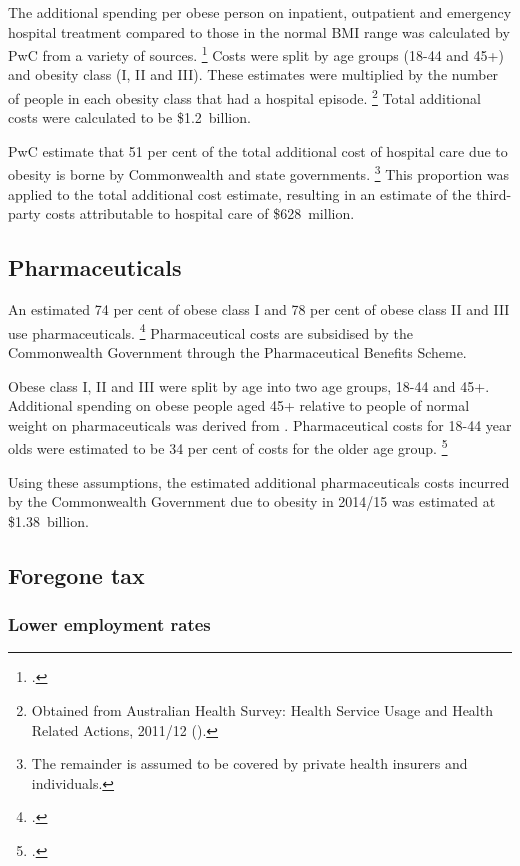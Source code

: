 \documentclass[embargoed]{grattan}
\begin{document}
The additional spending per obese person on inpatient, outpatient and emergency hospital treatment compared to those in the normal BMI range was calculated by PwC from a variety of sources.%
\footcite[][48]{PwC2015Weighingcostobesity} Costs were split by age groups (18-44 and 45+) and obesity class (I, II and III).
These estimates were multiplied by the number of people in each obesity class that had a hospital episode.%
\footnote{Obtained from Australian Health Survey: Health Service Usage and Health Related Actions, 2011/12 (\textcite{ABS20134364055002AustralianHealth}).} Total additional costs were calculated to be \$1.2~billion.

PwC estimate that 51 per cent of the total additional cost of hospital care due to obesity is borne by Commonwealth and state governments.%
\footnote{The remainder is assumed to be covered by private health insurers and individuals.} This proportion was applied to the total additional cost estimate, resulting in an estimate of the third-party costs attributable to hospital care of \$628~million.

\subsection{Pharmaceuticals }\label{pharmaceuticals}

An estimated 74 per cent of obese class I and 78 per cent of obese class II and III use pharmaceuticals.%
\footcite{Buchmueller2015Obesityhealthexpenditures} Pharmaceutical costs are subsidised by the Commonwealth Government through the Pharmaceutical Benefits Scheme.

Obese class I, II and III were split by age into two age groups, 18-44 and 45+.
Additional spending on obese people aged 45+ relative to people of normal weight on pharmaceuticals was derived from \textcite{Buchmueller2015Obesityhealthexpenditures}.
Pharmaceutical costs for 18-44 year olds were estimated to be 34 per cent of costs for the older age group.%
\footcite[][50]{PwC2015Weighingcostobesity}

Using these assumptions, the estimated additional pharmaceuticals costs incurred by the Commonwealth Government due to obesity in 2014/15 was estimated at \$1.38~billion.

\subsection{Foregone tax}\label{foregone-tax}

\subsubsection{Lower employment rates}
\end{document}
